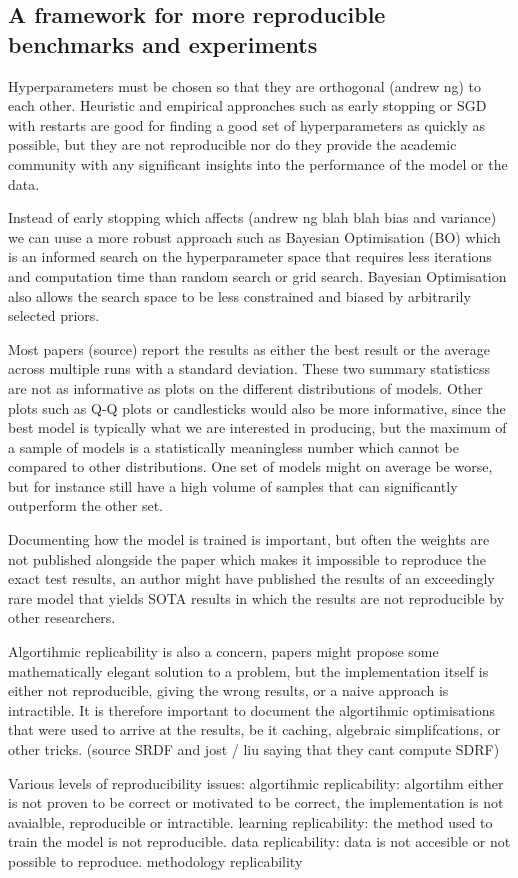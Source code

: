 \documentclass[a4paper,12pt]{article}
\begin{document}
\subsection{A framework for more reproducible benchmarks and experiments}
Hyperparameters must be chosen so that they are orthogonal (andrew ng) to each other.
Heuristic and empirical approaches such as early stopping or SGD with restarts are good for 
finding a good set of hyperparameters as quickly as possible, but they are not
reproducible nor do they provide the academic community with 
any significant insights into the performance of the model or the data.

Instead of early stopping which affects (andrew ng blah blah bias and variance)
we can uuse a more robust approach such as Bayesian Optimisation (BO) which 
is an informed search on the hyperparameter space that requires
less iterations and computation time than random search or grid search.
Bayesian Optimisation also allows the search space to be less constrained and biased by
arbitrarily selected priors.

Most papers (source) report the results as either the best result or the average across
multiple runs with a standard deviation. These two summary statisticss are
not as informative as plots on the different distributions of models.
Other plots such as Q-Q plots or candlesticks would also be more informative, since
the best model is typically what we are interested in producing, but the maximum of a sample of models is a statistically meaningless number which cannot be compared to other distributions.
One set of models might on average be worse, but for instance still have
a high volume of samples that can significantly outperform the other set.

Documenting how the model is trained is important, but often the weights are not
published alongside the paper which makes it impossible to reproduce the exact 
test results, an author might have published the results of an exceedingly
rare model that yields SOTA results in which the results are not reproducible by
other researchers.

Algortihmic replicability is also a concern, papers might propose some mathematically
elegant solution to a problem, but the implementation itself is either not 
reproducible, giving the wrong results, or a naive approach is intractible.
It is therefore important to document the algortihmic optimisations that were
used to arrive at the results, be it caching, algebraic simplifcations, or
other tricks. (source SRDF and jost / liu saying that they cant compute SDRF)

Various levels of reproducibility issues:
algortihmic replicability: algortihm either is not proven to be
correct or motivated to be correct, the implementation is not
avaialble, reproducible or intractible.
learning replicability: the method used to train the model is not reproducible.
data replicability: data is not accesible or not possible to reproduce.
methodology replicability



\printbibliography
\end{document}
